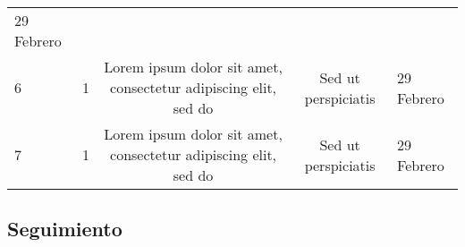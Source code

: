 \documentclass[]{book}
\begin{document}
\begin{longtable}[]{@{}lcccl@{}}
\begin{minipage}[t]{0.11\columnwidth}
29 Febrero\strut
\end{minipage}\tabularnewline
\begin{minipage}[t]{0.03\columnwidth}\raggedright\strut
6\strut
\end{minipage} & \begin{minipage}[t]{0.23\columnwidth}\centering\strut
1\strut
\end{minipage} & \begin{minipage}[t]{0.37\columnwidth}\centering\strut
Lorem ipsum dolor sit amet, consectetur adipiscing elit, sed do\strut
\end{minipage} & \begin{minipage}[t]{0.12\columnwidth}\centering\strut
Sed ut perspiciatis\strut
\end{minipage} & \begin{minipage}[t]{0.11\columnwidth}\raggedright\strut
29 Febrero\strut
\end{minipage}\tabularnewline
\begin{minipage}[t]{0.03\columnwidth}\raggedright\strut
7\strut
\end{minipage} & \begin{minipage}[t]{0.23\columnwidth}\centering\strut
1\strut
\end{minipage} & \begin{minipage}[t]{0.37\columnwidth}\centering\strut
Lorem ipsum dolor sit amet, consectetur adipiscing elit, sed do\strut
\end{minipage} & \begin{minipage}[t]{0.12\columnwidth}\centering\strut
Sed ut perspiciatis\strut
\end{minipage} & \begin{minipage}[t]{0.11\columnwidth}\raggedright\strut
29 Febrero\strut
\end{minipage}\tabularnewline
\bottomrule
\end{longtable}

\subsection{Seguimiento}\label{seguimiento}
\end{document}
